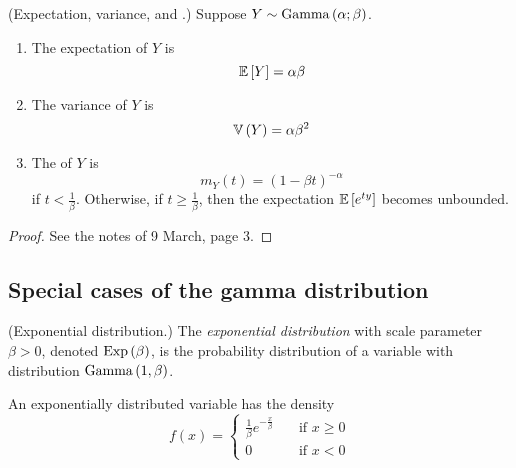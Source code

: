 \documentclass[11pt]{article}
\begin{document}
\begin{thm}{(Expectation, variance, and \mgf{}.)}
    Suppose $Y \sim \operatorname{Gamma}\left(\alpha;\beta\right)$.
    \begin{enumerate}
        \item
            The expectation of $Y$ is
            \begin{equation*}
                \operatorname{\mathbb{E}}{\left[Y\right]} = \alpha \beta
            \end{equation*}
        \item
            The variance of $Y$ is
            \begin{equation*}
                \operatorname{\mathbb{V}}{\left(Y\right)} = \alpha \beta^2
            \end{equation*}
        \item
            The \mgf{} of $Y$ is
            \begin{equation*}
                m_Y(t) = (1 - \beta t)^{-\alpha}
            \end{equation*}
            if $t < \frac{1}{\beta}$.
            Otherwise, if $t \geq \frac{1}{\beta}$,
            then the expectation $\operatorname{\mathbb{E}}{\left[e^{ty}\right]}$ becomes unbounded.
    \end{enumerate}
\end{thm}

\begin{proof}
    See the notes of 9 March, page 3.
\end{proof}

\subsection{Special cases of the gamma distribution}

\begin{defn}{(Exponential distribution.)}
    The \emph{exponential distribution} with scale parameter $\beta > 0$,
    denoted $\operatorname{Exp}\left(\beta\right)$,
    is the probability distribution of a variable with distribution
    $\operatorname{Gamma}\left(1, \beta\right)$.

    An exponentially distributed variable has the density
    \begin{equation*}
        f(x) = \begin{cases}
            \frac{1}{\beta} e^{-\frac{x}{\beta}}
                &\quad\text{if } x \geq 0
            \\
            0
                &\quad\text{if } x < 0
        \end{cases}
    \end{equation*}
\end{defn}
\end{document}
